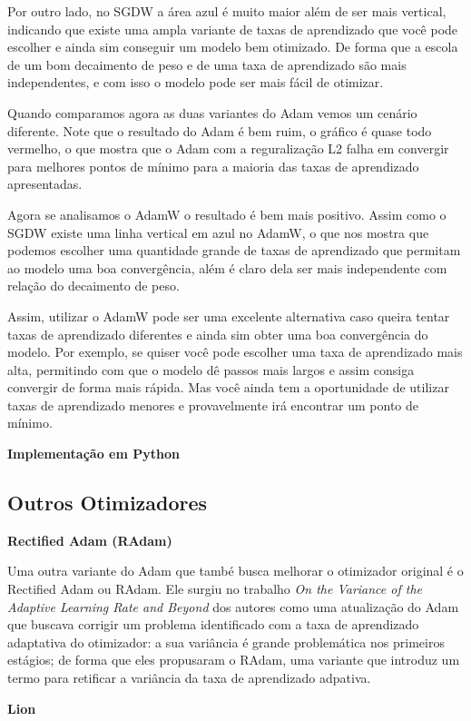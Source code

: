 Por outro lado, no SGDW a área azul é muito maior além de ser mais vertical, indicando que existe uma ampla variante de taxas de aprendizado que você pode escolher e ainda sim conseguir um modelo bem otimizado. De forma que a escola de um bom decaimento de peso e de uma taxa de aprendizado são mais independentes, e com isso o modelo pode ser mais fácil de otimizar.

Quando comparamos agora as duas variantes do Adam vemos um cenário diferente. Note que o resultado do Adam é bem ruim, o gráfico é quase todo vermelho, o que mostra que o Adam com a reguralização L2 falha em convergir para melhores pontos de mínimo para a maioria das taxas de aprendizado apresentadas.

Agora se analisamos o AdamW o resultado é bem mais positivo. Assim como o SGDW existe uma linha vertical em azul no AdamW, o que nos mostra que podemos escolher uma quantidade grande de taxas de aprendizado que permitam ao modelo uma boa convergência, além é claro dela ser mais independente com relação do decaimento de peso.

Assim, utilizar o AdamW pode ser uma excelente alternativa caso queira tentar taxas de aprendizado diferentes e ainda sim obter uma boa convergência do modelo. Por exemplo, se quiser você pode escolher uma taxa de aprendizado mais alta, permitindo com que o modelo dê passos mais largos e assim consiga convergir de forma mais rápida. Mas você ainda tem a oportunidade de utilizar taxas de aprendizado menores e provavelmente irá encontrar um ponto de mínimo.

\textbf{Implementação em Python}

\subsection{Outros Otimizadores}

\textbf{Rectified Adam (RAdam)}

Uma outra variante do Adam que també busca melhorar o otimizador original é o Rectified Adam ou RAdam. Ele surgiu no trabalho \textit{On the Variance of the Adaptive Learning Rate and Beyond} dos autores \textcite{RAdamMethod} como uma atualização do Adam que buscava corrigir um problema identificado com a taxa de aprendizado adaptativa do otimizador: a sua variância é grande problemática nos primeiros estágios; de forma que eles propusaram o RAdam, uma variante que introduz um termo para retificar a variância da taxa de aprendizado adpativa.

\textbf{Lion}

